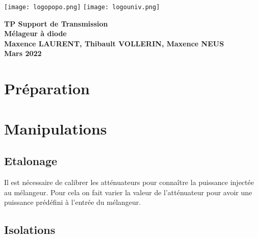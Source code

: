 \documentclass[oneside,a4paper,12pt]{article}
\begin{document}
	\begin{titlepage}
		\texttt{[image: logopopo.png]}
		\hspace*{\fill}
		\texttt{[image: logouniv.png]}
		
		\begin{center}
			\vspace{1cm}
			\textbf{TP Support de Transmission}\\
			\textbf{Mélageur à diode}\\
			\vspace{1cm}
			\textbf{Maxence LAURENT, Thibault VOLLERIN, Maxence NEUS}\\
			\vspace{3cm}
			\vspace{\fill}
			\textbf{Mars 2022}\\
		\end{center}
	\end{titlepage}
	
	\tableofcontents
	
	\vspace{5cm}
	
	\begin{abstract}
	
 	\end{abstract}

	\newpage

	\section{Préparation}
	
	\newpage

	\section{Manipulations}

	\subsection{Etalonage}

	Il est nécessaire de calibrer les atténuateurs pour connaître la puissance injectée au mélangeur.
	Pour cela on fait varier la valeur de l'atténuateur pour avoir une puissance prédéfini à l'entrée du mélangeur.
	
	\subsection{Isolations}
\end{document}
